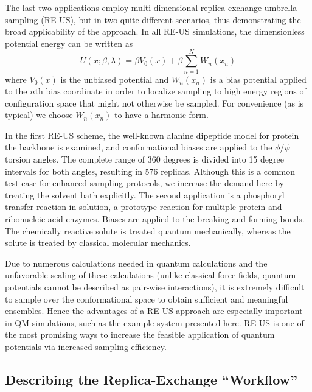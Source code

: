 \documentclass{sig-alternate}
\begin{document}
The last two applications employ multi-dimensional replica exchange umbrella 
sampling (RE-US), but in two quite different scenarios, thus demonstrating the 
broad applicability of the approach.  In all RE-US simulations, the 
dimensionless potential energy can be written as
\begin{equation}
U(x;\beta,\lambda) = \beta V_0(x) + \beta \sum_{n=1}^N W_n(x_n)
\end{equation}
where $V_0(x)$ is the unbiased potential and $W_n(x_n)$ is a bias potential 
applied to the $n$th bias coordinate in order to localize sampling to high 
energy regions of configuration space that might not otherwise be sampled. For 
convenience (as is typical) we choose $W_n(x_n)$ to have a harmonic form. 

In the first RE-US scheme, the well-known alanine dipeptide model for protein 
the backbone is examined, and conformational biases are applied to the 
$\phi$/$\psi$ torsion angles. The complete range of 360 degrees is divided into
15 degree intervals for both angles, resulting in 576 replicas. Although this 
is a common test case for enhanced sampling protocols, we increase the demand 
here by treating the solvent bath explicitly. The second application is a 
phosphoryl transfer reaction in solution, a prototype reaction for multiple 
protein and ribonucleic acid enzymes. Biases are applied to the breaking and
forming bonds. The chemically reactive solute is treated quantum mechanically, 
whereas the solute is treated by classical molecular mechanics. 

Due to numerous calculations needed in quantum calculations and the unfavorable
scaling of these calculations (unlike classical force fields, quantum 
potentials cannot be described as pair-wise interactions), it is extremely 
difficult to sample over the conformational space to obtain sufficient and 
meaningful ensembles.  Hence the advantages of a RE-US approach are especially 
important in QM simulations, such as the example system presented here.  RE-US
is one of the most promising ways to increase the feasible application of 
quantum potentials via increased sampling efficiency.

\subsection{Describing the Replica-Exchange ``Workflow'' } \label{}

\end{document}
